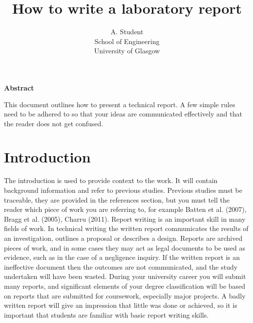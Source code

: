 \documentclass[11pt,a4]{article}
\date{}
\title{How to write a laboratory report}
\author{A. Student\\
School of Engineering\\
University of Glasgow}
\begin{document}
\maketitle

\begin{center}
{\bf Abstract}
\end{center}

This document outlines how to present a technical report. A few simple rules need to be adhered to so that your ideas are communicated effectively and that the reader does not get confused.

\section{Introduction}
The introduction is used to provide context to the work. It will contain background information and refer to previous studies. Previous studies must be traceable, they are provided in the references section, but you must tell the reader which piece of work you are referring to, for example Batten et al. (2007), Bragg et al. (2005), Charru (2011). 
Report writing is an important skill in many fields of work. In technical writing the written report communicates the results of an investigation, outlines a proposal or describes a design. Reports are archived pieces of work, and in some cases they may act as legal documents to be used as evidence, such as in the case of a negligence inquiry. If the written report is an ineffective document then the outcomes are not communicated, and the study undertaken will have been wasted. During your university career you will submit many reports, and significant elements of your degree classification will be based on reports that are submitted for coursework, especially major projects. A badly written report will give an impression that little was done or achieved, so it is important that students are familiar with basic report writing skills. 
\end{document}
